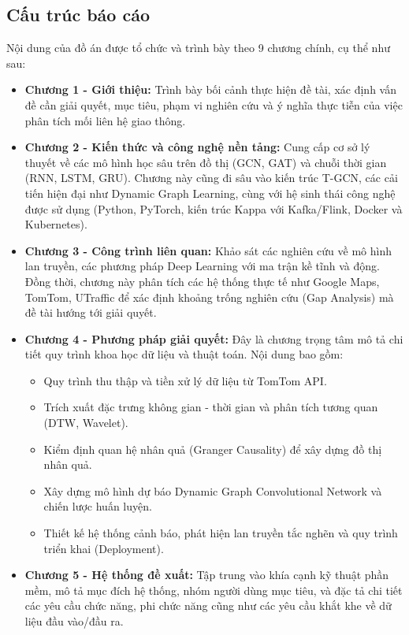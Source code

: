 \newpage
\subsection{Cấu trúc báo cáo} Nội dung của đồ án được tổ chức và trình bày theo 9 chương chính, cụ thể như sau:

\begin{itemize} \item \textbf{Chương 1 - Giới thiệu:} Trình bày bối cảnh thực hiện đề tài, xác định vấn đề cần giải quyết, mục tiêu, phạm vi nghiên cứu và ý nghĩa thực tiễn của việc phân tích mối liên hệ giao thông.

\item \textbf{Chương 2 - Kiến thức và công nghệ nền tảng:} Cung cấp cơ sở lý thuyết về các mô hình học sâu trên đồ thị (GCN, GAT) và chuỗi thời gian (RNN, LSTM, GRU). Chương này cũng đi sâu vào kiến trúc T-GCN, các cải tiến hiện đại như Dynamic Graph Learning, cùng với hệ sinh thái công nghệ được sử dụng (Python, PyTorch, kiến trúc Kappa với Kafka/Flink, Docker và Kubernetes).

\item \textbf{Chương 3 - Công trình liên quan:} Khảo sát các nghiên cứu về mô hình lan truyền, các phương pháp Deep Learning với ma trận kề tĩnh và động. Đồng thời, chương này phân tích các hệ thống thực tế như Google Maps, TomTom, UTraffic để xác định khoảng trống nghiên cứu (Gap Analysis) mà đề tài hướng tới giải quyết.

\item \textbf{Chương 4 - Phương pháp giải quyết:} Đây là chương trọng tâm mô tả chi tiết quy trình khoa học dữ liệu và thuật toán. Nội dung bao gồm:
\begin{itemize}
    \item Quy trình thu thập và tiền xử lý dữ liệu từ TomTom API.
    \item Trích xuất đặc trưng không gian - thời gian và phân tích tương quan (DTW, Wavelet).
    \item Kiểm định quan hệ nhân quả (Granger Causality) để xây dựng đồ thị nhân quả.
    \item Xây dựng mô hình dự báo Dynamic Graph Convolutional Network và chiến lược huấn luyện.
    \item Thiết kế hệ thống cảnh báo, phát hiện lan truyền tắc nghẽn và quy trình triển khai (Deployment).
\end{itemize}

\item \textbf{Chương 5 - Hệ thống đề xuất:} Tập trung vào khía cạnh kỹ thuật phần mềm, mô tả mục đích hệ thống, nhóm người dùng mục tiêu, và đặc tả chi tiết các yêu cầu chức năng, phi chức năng cũng như các yêu cầu khắt khe về dữ liệu đầu vào/đầu ra.


\end{itemize}
